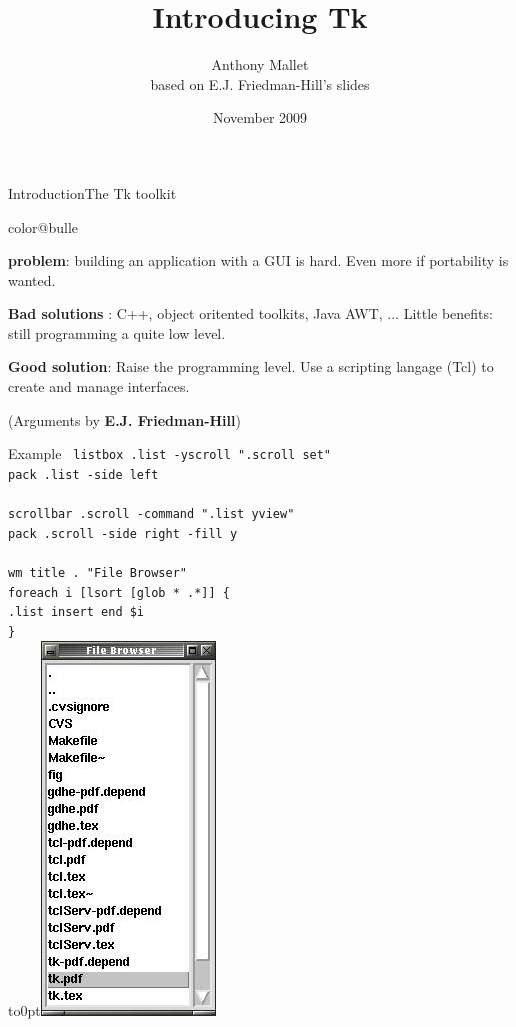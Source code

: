 \documentclass[a4paper,landscape,smooth]{show}
\title{Introducing Tk}
\author{Anthony Mallet\\ based on E.J. Friedman-Hill's slides}
\date{November 2009}
\begin{document}
\maketitle


\begin{part}{Introduction}{The Tk toolkit}
   \vfill
   \begin{bitemize}{color@bulle}
      \item {\bf problem}: building an application with a GUI is hard.
        Even more if portability is wanted. 

      \item {\bf Bad solutions} : 
	 C++, object oritented toolkits, Java AWT, ...
         Little benefits: still programming a quite low level.

      \item {\bf Good solution}: 
        Raise the programming level. Use a scripting langage (Tcl) to
        create and manage interfaces.
   \end{bitemize}
   \vfill
   (Arguments by {\bf E.J. Friedman-Hill})
   \vfill
\end{part}


\begin{tslide}{Example}
   \vfill
   {\tt
   listbox .list -yscroll ".scroll set"\\
   pack .list -side left\\
\\
   scrollbar .scroll -command ".list yview"\\
   pack .scroll -side right -fill y\\
\\
   wm title . "File Browser"\\
   foreach i [lsort [glob * .*]] \{\\
\hspace*{1cm}.list insert end \$i\\ \}\\
   }
   \vfill
   \vbox to0pt{\vss\hfill\includegraphics[width=0.3\linewidth]{fig/file-browser.jpg}}
\end{tslide}
\end{document}
